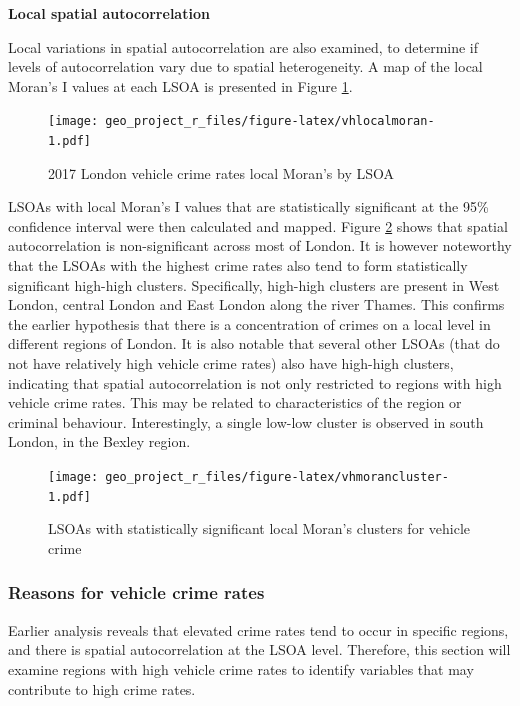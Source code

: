 \documentclass[]{article}
\theoremstyle{definition}
\theoremstyle{definition}
\theoremstyle{definition}
\theoremstyle{remark}
\begin{document}
\textbf{Local spatial autocorrelation}

Local variations in spatial autocorrelation are also examined, to
determine if levels of autocorrelation vary due to spatial
heterogeneity. A map of the local Moran's I values at each LSOA is
presented in Figure \ref{fig:vhlocalmoran}.

\begin{figure}
\centering
\texttt{[image: geo\_project\_r\_files/figure-latex/vhlocalmoran-1.pdf]}
\caption{\label{fig:vhlocalmoran}2017 London vehicle crime rates local
Moran's by LSOA}
\end{figure}

LSOAs with local Moran's I values that are statistically significant at
the 95\% confidence interval were then calculated and mapped. Figure
\ref{fig:vhmorancluster} shows that spatial autocorrelation is
non-significant across most of London. It is however noteworthy that the
LSOAs with the highest crime rates also tend to form statistically
significant high-high clusters. Specifically, high-high clusters are
present in West London, central London and East London along the river
Thames. This confirms the earlier hypothesis that there is a
concentration of crimes on a local level in different regions of London.
It is also notable that several other LSOAs (that do not have relatively
high vehicle crime rates) also have high-high clusters, indicating that
spatial autocorrelation is not only restricted to regions with high
vehicle crime rates. This may be related to characteristics of the
region or criminal behaviour. Interestingly, a single low-low cluster is
observed in south London, in the Bexley region.

\begin{figure}
\centering
\texttt{[image: geo\_project\_r\_files/figure-latex/vhmorancluster-1.pdf]}
\caption{\label{fig:vhmorancluster}LSOAs with statistically significant
local Moran's clusters for vehicle crime}
\end{figure}

\subsubsection{Reasons for vehicle crime
rates}\label{reasons-for-vehicle-crime-rates}

Earlier analysis reveals that elevated crime rates tend to occur in
specific regions, and there is spatial autocorrelation at the LSOA
level. Therefore, this section will examine regions with high vehicle
crime rates to identify variables that may contribute to high crime
rates.
\end{document}

